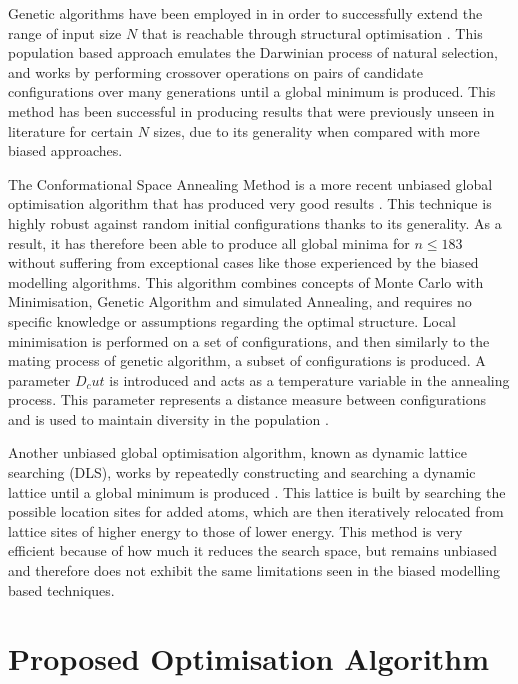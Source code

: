 \documentclass{article}
\begin{document}
Genetic algorithms have been employed in in order to successfully extend the
range of input size $N$ that is reachable through structural optimisation
\cite{DAVEN1996195, doi:10.1002/qua.560440214,PULLAN1998331}. This population
based approach emulates the Darwinian process of natural selection, and works by
performing crossover operations on pairs of candidate configurations over many
generations until a global minimum is produced. This method has been successful
in producing results that were previously unseen in literature for certain $N$
sizes, due to its generality when compared with more biased approaches.

The Conformational Space Annealing Method is a more recent unbiased global
optimisation algorithm that has produced very good results
\cite{PhysRevLett.91.080201}. This technique is highly robust against random
initial configurations thanks to its generality. As a result, it has therefore
been able to produce all global minima for $n\leq183$ without suffering from
exceptional cases like those experienced by the biased modelling algorithms.
This algorithm combines concepts of Monte Carlo with Minimisation, Genetic
Algorithm and simulated Annealing, and requires no specific knowledge or
assumptions regarding the optimal structure. Local minimisation is performed on
a set of configurations, and then similarly to the mating process of genetic
algorithm, a subset of configurations is produced. A parameter $D_cut$ is
introduced and acts as a temperature variable in the annealing process. This
parameter represents a distance measure between configurations and is used to
maintain diversity in the population \cite{PhysRevLett.91.080201}.

Another unbiased global optimisation algorithm, known as dynamic lattice
searching (DLS), works by repeatedly constructing and searching a dynamic
lattice until a global minimum is produced \cite{doi:10.1002/jcc.20096}. This
lattice is built by searching the possible location sites for added atoms, which
are then iteratively relocated from lattice sites of higher energy to those of
lower energy. This method is very efficient because of how much it reduces the
search space, but remains unbiased and therefore does not exhibit the same
limitations seen in the biased modelling based techniques.

\section{Proposed Optimisation Algorithm} \label{proposed}

\pagebreak

\printbibliography
\end{document}
